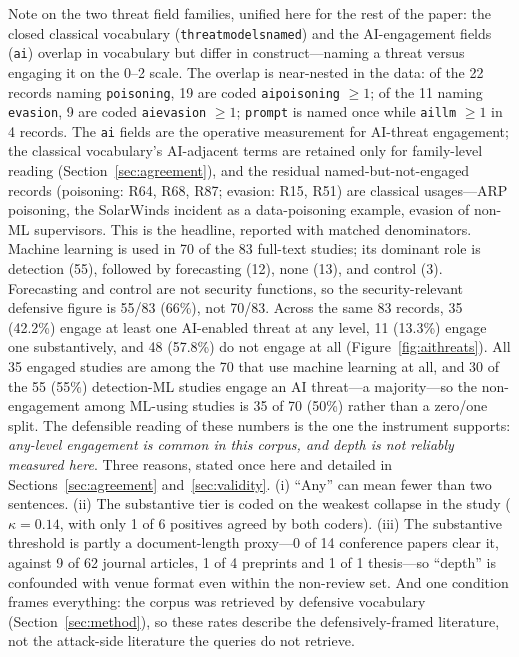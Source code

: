 \documentclass[preprint,12pt]{elsarticle}
\renewcommand{\_}{\plainunderscore\allowbreak}
\begin{document}
\label{sec:ai-threats}
Note on the two threat field families, unified here for the rest of the paper: the closed
classical vocabulary (\texttt{threat\_models\_named}) and the AI-engagement fields
(\texttt{ai\_*}) overlap in vocabulary but differ in construct---naming a threat versus
engaging it on the 0--2 scale. The overlap is near-nested in the data: of the 22 records
naming \texttt{poisoning}, 19 are coded \texttt{ai\_poisoning} $\ge 1$; of the 11 naming
\texttt{evasion}, 9 are coded \texttt{ai\_evasion} $\ge 1$; \texttt{prompt} is named
once while \texttt{ai\_llm} $\ge 1$ in 4 records. The \texttt{ai\_*} fields are the
operative measurement for AI-threat engagement; the classical vocabulary's AI-adjacent
terms are retained only for family-level reading (Section~\ref{sec:agreement}), and the
residual named-but-not-engaged records (poisoning: R64, R68, R87; evasion: R15, R51) are
classical usages---ARP poisoning, the SolarWinds incident as a data-poisoning example,
evasion of non-ML supervisors.
This is the headline, reported with matched denominators. Machine learning is used in 70 of
the 83 full-text studies; its dominant role is detection (55), followed by forecasting (12),
none (13), and control (3). Forecasting and control are not security functions, so the
security-relevant defensive figure is 55/83 (66\%), not 70/83. Across the same 83 records,
35 (42.2\%) engage at least one AI-enabled threat at any level, 11 (13.3\%) engage one
substantively, and 48 (57.8\%) do not engage at all (Figure~\ref{fig:aithreats}). All 35
engaged studies are among the 70 that use machine learning at all, and 30 of the 55
(55\%) detection-ML studies engage an AI threat---a majority---so the non-engagement among
ML-using studies is 35 of 70 (50\%) rather than a zero/one split. The defensible reading
of these numbers is the one the instrument supports: \emph{any-level engagement is common
in this corpus, and depth is not reliably measured here}. Three reasons, stated once here
and detailed in Sections~\ref{sec:agreement} and~\ref{sec:validity}. (i) ``Any'' can
mean fewer than two sentences. (ii) The substantive tier is coded on the weakest collapse
in the study ($\kappa = 0.14$, with only 1 of 6 positives agreed by both coders).
(iii) The substantive threshold is partly a document-length proxy---0 of 14 conference
papers clear it, against 9 of 62 journal articles, 1 of 4 preprints and 1 of 1 thesis---so
``depth'' is confounded with venue format even within the non-review set. And one
condition frames everything: the corpus was retrieved by defensive vocabulary
(Section~\ref{sec:method}), so these rates describe the defensively-framed literature,
not the attack-side literature the queries do not retrieve.
\end{document}
